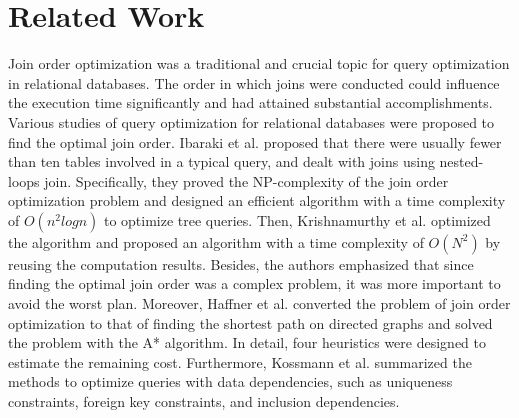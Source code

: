 \section{Related Work}
\label{sec:related-work}


 Join order optimization was a traditional and crucial topic for query optimization in relational databases. The order in which joins were conducted could influence the execution time significantly and had attained substantial accomplishments. Various studies of query optimization for relational databases were proposed to find the optimal join order. Ibaraki et al.\cite{nested-tods-1984} proposed that there were usually fewer than ten tables involved in a typical query, and dealt with joins using nested-loops join. Specifically, they proved the NP-complexity of the join order optimization problem and designed an efficient algorithm with a time complexity of $O(n^2logn)$ to optimize tree queries. Then, Krishnamurthy et al.\cite{optimize-nested-vldb-1986} optimized the algorithm and proposed an algorithm with a time complexity of $O(N^2)$ by reusing the computation results. Besides, the authors emphasized that since finding the optimal join order was a complex problem, it was more important to avoid the worst plan. Moreover, Haffner et al.\cite{astarjoin} converted the problem of join order optimization to that of finding the shortest path on directed graphs and solved the problem with the A* algorithm. In detail, four heuristics were designed to estimate the remaining cost. Furthermore, Kossmann et al.\cite{data-dependency-join} summarized the methods to optimize queries with data dependencies, such as uniqueness constraints, foreign key constraints, and inclusion dependencies.


